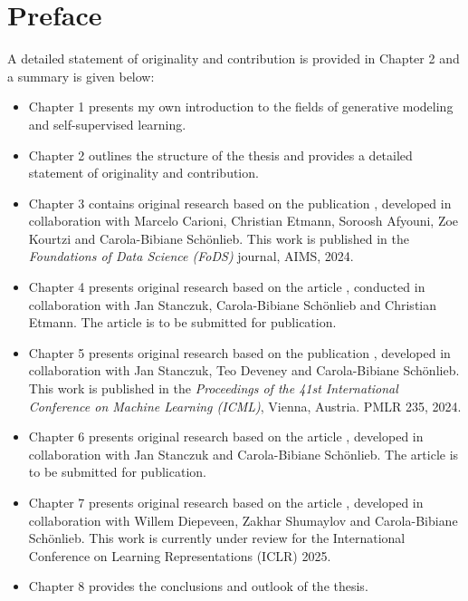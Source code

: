 
\section*{Preface}
\label{sec:Preface}

A detailed statement of originality and contribution is provided in Chapter 2 and a summary is given below:

\begin{itemize}
    \item Chapter 1 presents my own introduction to the fields of generative modeling and self-supervised learning.
    
    \item Chapter 2 outlines the structure of the thesis and provides a detailed statement of originality and contribution.
    
    \item Chapter 3 contains original research based on the publication \cite{batzolis2024caflow}, developed in collaboration with Marcelo Carioni, Christian Etmann, Soroosh Afyouni, Zoe Kourtzi and Carola-Bibiane Sch\"onlieb. This work is published in the \textit{Foundations of Data Science (FoDS)} journal, AIMS, 2024.
    
    \item Chapter 4 presents original research based on the article \cite{batzolis2022non_uniform}, conducted in collaboration with Jan Stanczuk, Carola-Bibiane Sch\"onlieb and Christian Etmann. The article is to be submitted for publication.
    
    \item Chapter 5 presents original research based on the publication \cite{pmlr-v235-stanczuk24a}, developed in collaboration with Jan Stanczuk, Teo Deveney and Carola-Bibiane Sch\"onlieb. This work is published in the \textit{Proceedings of the 41st International Conference on Machine Learning (ICML)}, Vienna, Austria. PMLR 235, 2024.
    
    \item Chapter 6 presents original research based on the article \cite{batzolis2023variational}, developed in collaboration with Jan Stanczuk and Carola-Bibiane Sch\"onlieb. The article is to be submitted for publication.
    
    \item Chapter 7 presents original research based on the article \cite{diepeveen2024score}, developed in collaboration with Willem Diepeveen, Zakhar Shumaylov and Carola-Bibiane Sch\"onlieb. This work is currently under review for the International Conference on Learning Representations (ICLR) 2025.
    
    \item Chapter 8 provides the conclusions and outlook of the thesis.
\end{itemize}

